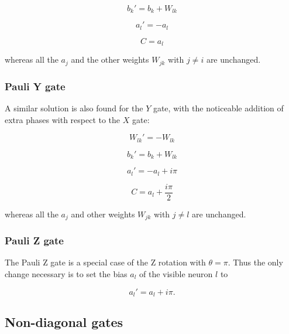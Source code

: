 \begin{equation}
   b_{k}\prime = b_{k} + W_{lk}
\end{equation}

\begin{equation}
   a_{l}\prime = -a_{l}
\end{equation}

\begin{equation}
   C = a_{l}
\end{equation}

whereas all the $a_{j}$ and the other weights $W_{jk}$ with $j \neq i$ are unchanged.

\subsubsection{Pauli Y gate}
A similar solution is also found for the $Y$ gate, with the noticeable addition of extra phases
with respect to the $X$ gate:

\begin{equation}
   W_{lk}\prime = -W_{lk}
\end{equation}

\begin{equation}
   b_{k}\prime = b_{k} + W_{lk}
\end{equation}

\begin{equation}
   a_{l}\prime = -a_{l} + i \pi
\end{equation}

\begin{equation}
   C = a_{l} + \frac{i \pi}{2}
\end{equation}

whereas all the $a_{j}$ and other weights $W_{jk}$ with $j \neq l$ are unchanged.

\subsubsection{Pauli Z gate}
The Pauli Z gate is a special case of the Z rotation with $\theta = \pi$. Thus the 
only change necessary is to set the bias $a_l$ of the visible neuron $l$ to

\begin{equation}
    a_{l}\prime = a_{l} + i \pi.
\end{equation}

\subsection{Non-diagonal gates}

